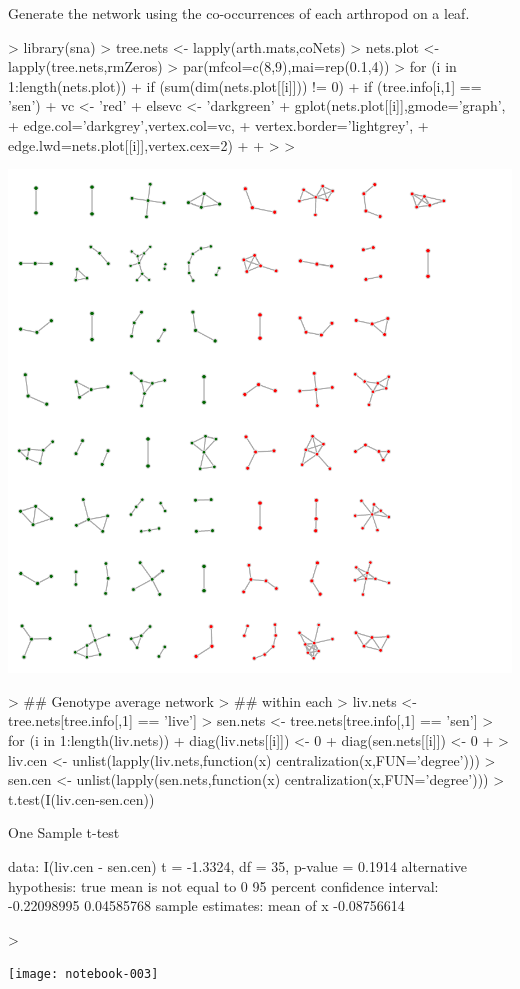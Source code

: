 \documentclass[12pt]{article}
\begin{document}
Generate the network using the co-occurrences of each arthropod on a leaf.

\begin{Schunk}
\begin{Sinput}
> library(sna)
> tree.nets <- lapply(arth.mats,coNets)
> nets.plot <- lapply(tree.nets,rmZeros)
> par(mfcol=c(8,9),mai=rep(0.1,4))
> for (i in 1:length(nets.plot)){
+     if (sum(dim(nets.plot[[i]])) != 0){
+         if (tree.info[i,1] == 'sen'){
+             vc <- 'red'
+         }else{vc <- 'darkgreen'}
+         gplot(nets.plot[[i]],gmode='graph',
+               edge.col='darkgrey',vertex.col=vc,
+               vertex.border='lightgrey',
+               edge.lwd=nets.plot[[i]],vertex.cex=2)
+     }
+ }
> 
> 
\end{Sinput}
\end{Schunk}
\includegraphics{notebook-002}

\begin{Schunk}
\begin{Sinput}
> ## Genotype average network 
> ## within each 
> liv.nets <- tree.nets[tree.info[,1] == 'live']
> sen.nets <- tree.nets[tree.info[,1] == 'sen']
> for (i in 1:length(liv.nets)){
+     diag(liv.nets[[i]]) <- 0
+     diag(sen.nets[[i]]) <- 0
+ }
> liv.cen <- unlist(lapply(liv.nets,function(x) centralization(x,FUN='degree')))
> sen.cen <- unlist(lapply(sen.nets,function(x) centralization(x,FUN='degree')))
> t.test(I(liv.cen-sen.cen))
\end{Sinput}
\begin{Soutput}
	One Sample t-test

data:  I(liv.cen - sen.cen)
t = -1.3324, df = 35, p-value = 0.1914
alternative hypothesis: true mean is not equal to 0
95 percent confidence interval:
 -0.22098995  0.04585768
sample estimates:
  mean of x 
-0.08756614 
\end{Soutput}
\begin{Sinput}
> 
\end{Sinput}
\end{Schunk}
\texttt{[image: notebook-003]}
\end{document}
